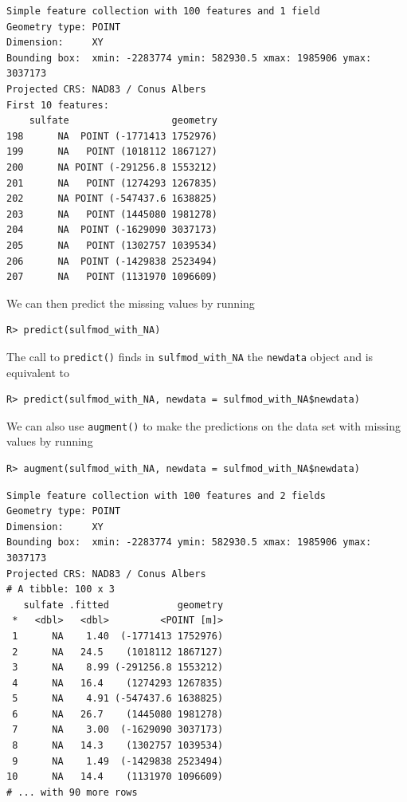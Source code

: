 \documentclass[10pt,letterpaper]{article}
\begin{document}
\begin{verbatim}
Simple feature collection with 100 features and 1 field
Geometry type: POINT
Dimension:     XY
Bounding box:  xmin: -2283774 ymin: 582930.5 xmax: 1985906 ymax: 3037173
Projected CRS: NAD83 / Conus Albers
First 10 features:
    sulfate                  geometry
198      NA  POINT (-1771413 1752976)
199      NA   POINT (1018112 1867127)
200      NA POINT (-291256.8 1553212)
201      NA   POINT (1274293 1267835)
202      NA POINT (-547437.6 1638825)
203      NA   POINT (1445080 1981278)
204      NA  POINT (-1629090 3037173)
205      NA   POINT (1302757 1039534)
206      NA  POINT (-1429838 2523494)
207      NA   POINT (1131970 1096609)
\end{verbatim}

We can then predict the missing values by running

\begin{verbatim}
R> predict(sulfmod_with_NA)
\end{verbatim}

The call to \texttt{predict()} finds in \texttt{sulfmod\_with\_NA} the
\texttt{newdata} object and is equivalent to

\begin{verbatim}
R> predict(sulfmod_with_NA, newdata = sulfmod_with_NA$newdata)
\end{verbatim}

We can also use \texttt{augment()} to make the predictions on the data
set with missing values by running

\begin{verbatim}
R> augment(sulfmod_with_NA, newdata = sulfmod_with_NA$newdata)
\end{verbatim}

\begin{verbatim}
Simple feature collection with 100 features and 2 fields
Geometry type: POINT
Dimension:     XY
Bounding box:  xmin: -2283774 ymin: 582930.5 xmax: 1985906 ymax: 3037173
Projected CRS: NAD83 / Conus Albers
# A tibble: 100 x 3
   sulfate .fitted            geometry
 *   <dbl>   <dbl>         <POINT [m]>
 1      NA    1.40  (-1771413 1752976)
 2      NA   24.5    (1018112 1867127)
 3      NA    8.99 (-291256.8 1553212)
 4      NA   16.4    (1274293 1267835)
 5      NA    4.91 (-547437.6 1638825)
 6      NA   26.7    (1445080 1981278)
 7      NA    3.00  (-1629090 3037173)
 8      NA   14.3    (1302757 1039534)
 9      NA    1.49  (-1429838 2523494)
10      NA   14.4    (1131970 1096609)
# ... with 90 more rows
\end{verbatim}
\end{document}
